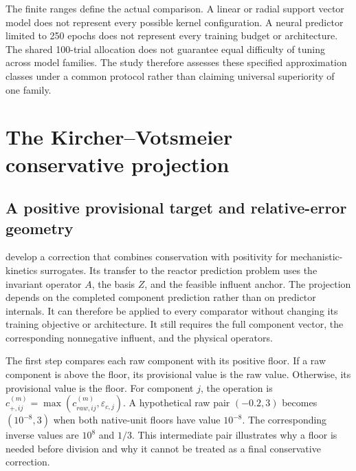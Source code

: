 The finite ranges define the actual comparison. A linear or radial support vector model does not represent every possible kernel configuration. A neural predictor limited to 250 epochs does not represent every training budget or architecture. The shared 100-trial allocation does not guarantee equal difficulty of tuning across model families. The study therefore assesses these specified approximation classes under a common protocol rather than claiming universal superiority of one family.

\section{The Kircher--Votsmeier conservative projection}

\subsection{A positive provisional target and relative-error geometry}

\citet{KircherVotsmeier2025} develop a correction that combines conservation with positivity for mechanistic-kinetics surrogates. Its transfer to the reactor prediction problem uses the invariant operator $A$, the basis $Z$, and the feasible influent anchor. The projection depends on the completed component prediction rather than on predictor internals. It can therefore be applied to every comparator without changing its training objective or architecture. It still requires the full component vector, the corresponding nonnegative influent, and the physical operators.

The first step compares each raw component with its positive floor. If a raw component is above the floor, its provisional value is the raw value. Otherwise, its provisional value is the floor. For component $j$, the operation is $c_{+,ij}^{(m)}=\max(c_{raw,ij}^{(m)},\varepsilon_{c,j})$. A hypothetical raw pair $(-0.2,3)$ becomes $(10^{-8},3)$ when both native-unit floors have value $10^{-8}$. The corresponding inverse values are $10^8$ and $1/3$. This intermediate pair illustrates why a floor is needed before division and why it cannot be treated as a final conservative correction.

